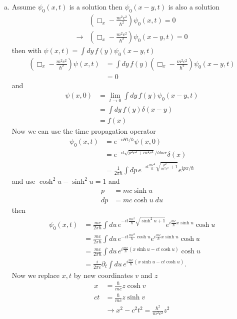 \documentclass[../main.tex]{subfiles}
\begin{document}
\begin{enumerate}[(a)]
\item Assume $\psi_0(x,t)$ is a solution then $\psi_0(x-y,t)$ is also a solution
\begin{align}
&\left(\Box_x-\frac{m^2c^2}{\hbar^2}\right)\psi_0(x,t)=0\\
\rightarrow&\left(\Box_x-\frac{m^2c^2}{\hbar^2}\right)\psi_0(x-y,t)=0
\end{align}
then with $\psi(x,t)=\int dy\,f(y)\psi_0(x-y,t)$
\begin{align}
\left(\Box_x-\frac{m^2c^2}{\hbar^2}\right)\psi(x,t)
&=\int dy\,f(y)\left(\Box_x-\frac{m^2c^2}{\hbar^2}\right)\psi_0(x-y,t)\\
&=0
\end{align}
and 
\begin{align}
\psi(x,0)&=\lim_{t\rightarrow0}\int dy\,f(y)\psi_0(x-y,t)\\
&=\int dy\,f(y)\delta(x-y)\\
&=f(x)
\end{align}
Now we can use the time propagation operator
\begin{align}
\psi_0(x,t)
&=e^{-iHt/\hbar}\psi(x,0)\\
&=e^{-it\sqrt{p^2c^2+m^2c^4}/hbar}\delta(x)\\
&=\frac{1}{2\pi\hbar}\int dp\, e^{-it\frac{mc^2}{\hbar}\sqrt{\frac{p^2}{m^2c^2}+1}}e^{ipx/\hbar}
\end{align}
and use $\cosh^2u-\sinh^2u=1$ and
\begin{align}
p&=mc\sinh u\\
dp&=mc\cosh u\;du
\end{align}
then
\begin{align}
\psi_0(x,t)
&=\frac{mc}{2\pi\hbar}\int du\, e^{-it\frac{mc^2}{\hbar}\sqrt{\sinh^2 u+1}}e^{i\frac{mc}{\hbar}x\sinh u}\cosh u\\
&=\frac{mc}{2\pi\hbar}\int du\, e^{-it\frac{mc^2}{\hbar}\cosh u}e^{i\frac{mc}{\hbar}x\sinh u}\cosh u\\
&=\frac{mc}{2\pi\hbar}\int du\,e^{i\frac{mc}{\hbar}(x\sinh u-ct\cosh u)}\cosh u\\
&=\frac{i}{2\pi c}\partial_t\int du\,e^{i\frac{mc}{\hbar}(x\sinh u-ct\cosh u)}.
\end{align}
Now we replace $x, t$ by new coordinates $v$ and $z$
\begin{align}
x&=\frac{\hbar}{mc}z\cosh v\\
ct&=\frac{\hbar}{mc}z\sinh v\\
&\rightarrow x^2-c^2t^2=\frac{\hbar^2}{m^2c^2}z^2
\end{align}

\end{enumerate}
\end{document}
